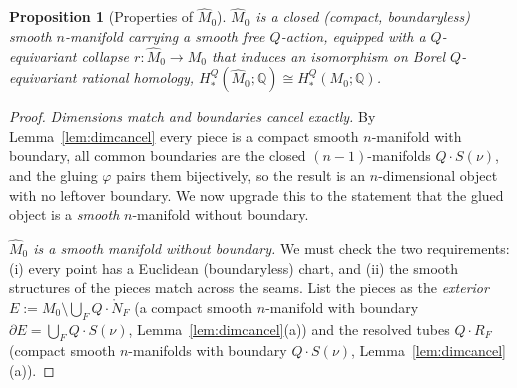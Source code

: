 \documentclass[12pt]{article}
\newtheorem{proposition}[theorem]{Proposition}
\theoremstyle{definition}
\begin{document}
\begin{proposition}[Properties of $\widehat M_0$]\label{prop:hatM}
$\widehat M_0$ is a closed (compact, \emph{boundaryless}) smooth $n$-manifold
carrying a smooth \emph{free} $Q$-action, equipped with a $Q$-equivariant
collapse $r\colon\widehat M_0\to M_0$ that induces an isomorphism on Borel
$Q$-equivariant rational homology, $H^Q_*(\widehat M_0;\mathbb{Q})\cong
H^Q_*(M_0;\mathbb{Q})$.
\end{proposition}
\begin{proof}
\emph{Dimensions match and boundaries cancel exactly.} By
Lemma~\ref{lem:dimcancel} every piece is a compact smooth $n$-manifold with
boundary, all common boundaries are the closed $(n-1)$-manifolds $Q\cdot S(\nu)$,
and the gluing $\varphi$ pairs them bijectively, so the result is an
$n$-dimensional object with no leftover boundary. We now upgrade this to the
statement that the glued object is a \emph{smooth} $n$-manifold without boundary.

\emph{$\widehat M_0$ is a smooth manifold without boundary.} We must check the
two requirements: (i) every point has a Euclidean (boundaryless) chart, and
(ii) the smooth structures of the pieces match across the seams. List the pieces
as the \emph{exterior}
$E:=M_0\setminus\bigcup_F Q\cdot\mathring N_F$ (a compact smooth $n$-manifold
with boundary $\partial E=\bigcup_F Q\cdot S(\nu)$, Lemma~\ref{lem:dimcancel}(a))
and the resolved tubes
$Q\cdot R_F$ (compact smooth $n$-manifolds with boundary $Q\cdot S(\nu)$,
Lemma~\ref{lem:dimcancel}(a)).


\end{proof}
\end{document}
